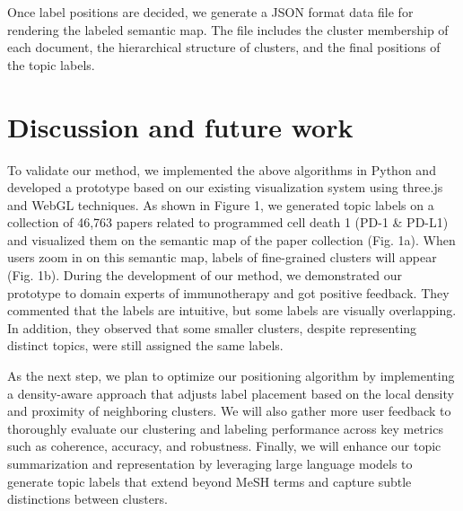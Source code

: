 \documentclass{vgtc}                          %
\begin{document}
Once label positions are decided, we generate a JSON format data file for rendering the labeled semantic map. The file includes the cluster membership of each document, the hierarchical structure of clusters, and the final positions of the topic labels. 


\section{Discussion and future work}

To validate our method, we implemented the above algorithms in Python and developed a prototype based on our existing visualization system using three.js and WebGL techniques. As shown in Figure 1, we generated topic labels on a collection of 46,763 papers related to programmed cell death 1 (PD-1 \& PD-L1) and visualized them on the semantic map of the paper collection (Fig. 1a). When users zoom in on this semantic map, labels of fine-grained clusters will appear (Fig. 1b). During the development of our method, we demonstrated our prototype to domain experts of immunotherapy and got positive feedback. They commented that the labels are intuitive, but some labels are visually overlapping. In addition, they observed that some smaller clusters, despite representing distinct topics, were still assigned the same labels.


As the next step, we plan to optimize our positioning algorithm by implementing a density-aware approach that adjusts label placement based on the local density and proximity of neighboring clusters. We will also gather more user feedback to thoroughly evaluate our clustering and labeling performance across key metrics such as coherence, accuracy, and robustness. Finally, we will enhance our topic summarization and representation by leveraging large language models to generate topic labels that extend beyond MeSH terms and capture subtle distinctions between clusters.







%

%
%
%


\end{document}
